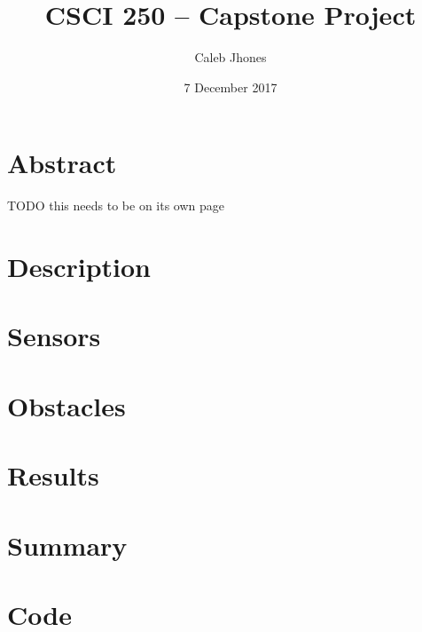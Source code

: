 \documentclass[11pt] {article}
\author{Caleb Jhones}
\date{7 December 2017}
\title{CSCI 250 -- Capstone Project}
\begin{document}
\maketitle

\section*{Abstract}
TODO this needs to be on its own page %

\newpage

\section{Description}



\section{Sensors}


\section{Obstacles}

\section{Results}

\section{Summary}

\section{Code} %
\end{document}
